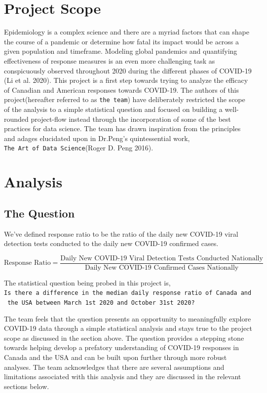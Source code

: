 \documentclass[
]{article}
\begin{document}
\hypertarget{project-scope}{%
\section{Project Scope}\label{project-scope}}

Epidemiology is a complex science and there are a myriad factors that
can shape the course of a pandemic or determine how fatal its impact
would be across a given population and timeframe. Modeling global
pandemics and quantifying effectiveness of response measures is an even
more challenging task as conspicuously observed throughout 2020 during
the different phases of COVID-19 (Li et al. 2020). This project is a
first step towards trying to analyze the efficacy of Canadian and
American responses towards COVID-19. The authors of this
project(hereafter referred to as \texttt{the\ team}) have deliberately
restricted the scope of the analysis to a simple statistical question
and focused on building a well-rounded project-flow instead through the
incorporation of some of the best practices for data science. The team
has drawn inspiration from the principles and adages elucidated upon in
Dr.Peng's quintessential work,
\texttt{The\ Art\ of\ Data\ Science}(Roger D. Peng 2016).

\hypertarget{analysis}{%
\section{Analysis}\label{analysis}}

\hypertarget{the-question}{%
\subsection{The Question}\label{the-question}}

We've defined response ratio to be the ratio of the daily new COVID-19
viral detection tests conducted to the daily new COVID-19 confirmed
cases.

\[ \text{Response Ratio} = \frac{\text{Daily New COVID-19 Viral Detection Tests Conducted Nationally}}{\text{Daily New COVID-19 Confirmed Cases Nationally}} \]

The statistical question being probed in this project is,
\texttt{Is\ there\ a\ difference\ in\ the\ median\ daily\ response\ ratio\ of\ Canada\ and\ the\ USA\ between\ March\ 1st\ 2020\ and\ October\ 31st\ 2020?}

The team feels that the question presents an opportunity to meaningfully
explore COVID-19 data through a simple statistical analysis and stays
true to the project scope as discussed in the section above. The
question provides a stepping stone towards helping develop a prefatory
understanding of COVID-19 responses in Canada and the USA and can be
built upon further through more robust analyses. The team acknowledges
that there are several assumptions and limitations associated with this
analysis and they are discussed in the relevant sections below.
\end{document}
